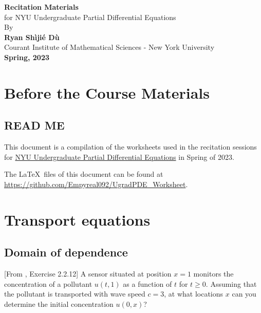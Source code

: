 \documentclass[11pt,letterpaper]{report}
\begin{document}
\begin{titlepage}
    \begin{center}
        \vspace*{4cm}
        \Huge
        \textbf{Recitation Materials} \\
        \vspace{0.5cm}
        \LARGE
        {for NYU Undergraduate Partial Differential Equations}\\
        \vspace{3cm}
        By\\
        \vspace{0.5cm}
        \textbf{Ryan Sh\`iji\'e D\`u}\\
        \vspace{0.2cm}
        \normalsize
        {Courant Institute of Mathematical Sciences - New York University}\\
        \vspace{2cm}
        \Large
        \textbf{Spring, 2023}
        
    \end{center}
\end{titlepage}

\setcounter{tocdepth}{1}
\tableofcontents

\setcounter{chapter}{-1}
\chapter{Before the Course Materials}
\section{READ ME}
This document is a compilation of the worksheets used in the recitation sessions for \href{https://math.nyu.edu/dynamic/courses/undergrad/math-ua-263/}{NYU Undergraduate Partial Differential Equations} in Spring of 2023. 

The \LaTeX\ files of this document can be found at \url{https://github.com/Empyreal092/UgradPDE_Worksheet}.


\chapter{Transport equations}
\section{Domain of dependence}
[From \cite{Olver_14}, Exercise 2.2.12] A sensor situated at position $x=1$ monitors the concentration of a pollutant $u(t,1)$ as a function of $t$ for $t\geq 0$. Assuming that the pollutant is transported with wave speed $c=3$, at what locations $x$ can you determine the initial concentration $u(0,x)$? 
\end{document}
